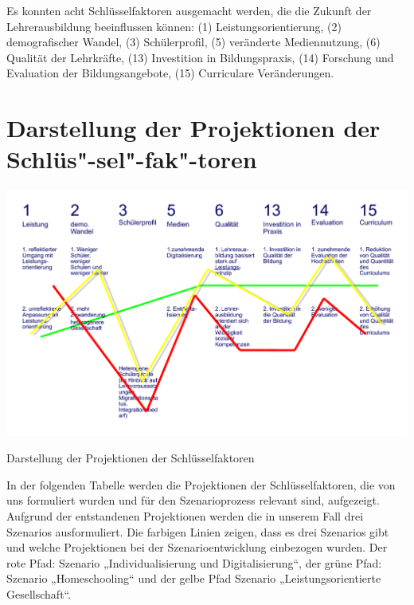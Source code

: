 \documentclass[12pt,a4paper]{article}
\begin{document}
Es konnten acht Schlüsselfaktoren ausgemacht werden, die die Zukunft der Lehrerausbildung beeinflussen können: (1) Leistungsorientierung, (2) demografischer Wandel, (3) Schülerprofil, (5) veränderte Mediennutzung, (6) Qualität der Lehrkräfte, (13) Investition in Bildungspraxis, (14) Forschung und Evaluation der Bildungsangebote, (15) Curriculare Veränderungen.

\section{Darstellung der Projektionen der Schlüs"-sel"-fak"-toren} 
\begin{table}[!ht]
\includegraphics[scale=0.8,angle=90]{projektionen.pdf}
\caption{Darstellung der Projektionen der Schlüsselfaktoren}
\label{projektionen}
\end{table}
In der folgenden Tabelle werden die Projektionen der Schlüsselfaktoren, die von uns formuliert wurden und für den Szenarioprozess relevant sind, aufgezeigt. Aufgrund der entstandenen Projektionen werden die in unserem Fall drei Szenarios ausformuliert. Die farbigen Linien zeigen, dass es drei Szenarios gibt und welche Projektionen bei der Szenarioentwicklung einbezogen wurden. Der rote Pfad: Szenario „Individualisierung und Digitalisierung“, der grüne Pfad: Szenario „Homeschooling“ und der gelbe Pfad Szenario „Leistungsorientierte Gesellschaft“.
\end{document}

